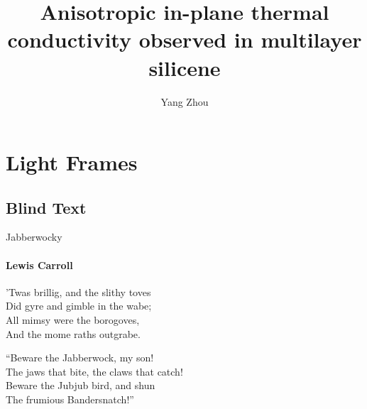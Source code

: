 \documentclass{beamer}
\title{Anisotropic in-plane thermal conductivity observed in multilayer silicene} %
\author{Yang Zhou}
\begin{document}
\frame{
\maketitle \\
{\color{white} \today}}


\section{Light Frames}
\subsection{Blind Text}
\begin{frame}{Jabberwocky}
  \framesubtitle{Lewis Carroll}%
  'Twas brillig, and the slithy toves\\
  Did gyre and gimble in the wabe;\\
  All mimsy were the borogoves,\\
  And the mome raths outgrabe.\\\bigskip

  “Beware the Jabberwock, my son!\\
  The jaws that bite, the claws that catch!\\
  Beware the Jubjub bird, and shun\\
  The frumious Bandersnatch!”\\
\end{frame}
\end{document}
